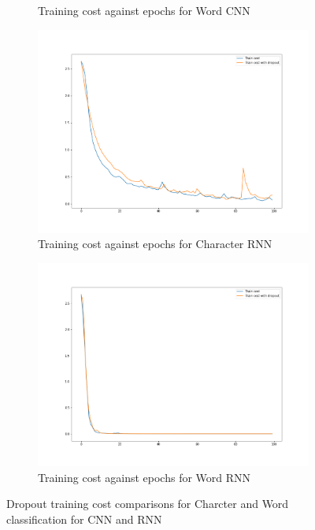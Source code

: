 \begin{figure}[H]
\begin{subfigure}{0.5\textwidth}
        \caption{Training cost against epochs for Word CNN}
    \end{subfigure}
    \begin{subfigure}{0.5\textwidth}
        \centering
        \includegraphics[width=1\linewidth]{assets/plots2/q3_3.png}
        \caption{Training cost against epochs for Character RNN}
    \end{subfigure}
    \begin{subfigure}{0.5\textwidth}
        \centering
        \includegraphics[width=1\linewidth]{assets/plots2/q4_3.png}
        \caption{Training cost against epochs for Word RNN}
    \end{subfigure}
    \caption{Dropout training cost comparisons for Charcter and Word classification for CNN and RNN}
    \label{fig:2_4_2}
\end{figure}

